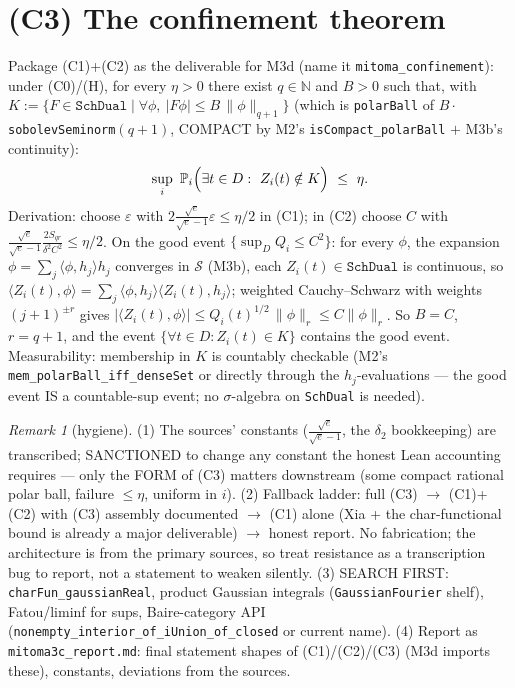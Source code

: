 \documentclass[11pt]{article}
\theoremstyle{plain}
\theoremstyle{remark}
\newtheorem{remark}{Remark}
\newcommand{\eps}{\varepsilon}\newcommand{\Sch}{\mathcal{S}}
\newcommand{\ip}[2]{\langle #1,#2\rangle}
\begin{document}
\section*{(C3) The confinement theorem}

Package (C1)+(C2) as the deliverable for M3d (name it
\texttt{mitoma\_confinement}): under (C0)/(H), for every $\eta>0$ there
exist $q\in\mathbb N$ and $B>0$ such that, with
$K:=\{F\in\texttt{SchDual}\mid\forall\phi,\ |F\phi|\le
B\,\|\phi\|_{q+1}\}$ (which is \texttt{polarBall} of
$B\cdot$\texttt{sobolevSeminorm}$(q{+}1)$, COMPACT by M2's
\texttt{isCompact\_polarBall} $+$ M3b's continuity):
\[
\sup_i\ \PP_i\Big(\exists t\in D:\ Z_i(t)\notin K\Big)\ \le\ \eta .
\]
Derivation: choose $\eps$ with $2\frac{\sqrt e}{\sqrt e-1}\eps\le\eta/2$
in (C1); in (C2) choose $C$ with
$\frac{\sqrt e}{\sqrt e-1}\frac{2S_{qr}}{\delta^2C^2}\le\eta/2$. On the
good event $\{\sup_DQ_i\le C^2\}$: for every $\phi$, the expansion
$\phi=\sum_j\ip{\phi}{h_j}h_j$ converges in $\Sch$ (M3b), each
$Z_i(t)\in\texttt{SchDual}$ is continuous, so
$\ip{Z_i(t)}{\phi}=\sum_j\ip{\phi}{h_j}\ip{Z_i(t)}{h_j}$; weighted
Cauchy--Schwarz with weights $(j+1)^{\pm r}$ gives
$|\ip{Z_i(t)}{\phi}|\le Q_i(t)^{1/2}\,\|\phi\|_r\le C\|\phi\|_r$. So
$B=C$, $r=q+1$, and the event $\{\forall t\in D:Z_i(t)\in K\}$ contains
the good event. Measurability: membership in $K$ is countably checkable
(M2's \texttt{mem\_polarBall\_iff\_denseSet} or directly through the
$h_j$-evaluations --- the good event IS a countable-sup event; no
$\sigma$-algebra on \texttt{SchDual} is needed).

\begin{remark}[hygiene]
(1) The sources' constants ($\frac{\sqrt e}{\sqrt e-1}$, the
$\delta_2$ bookkeeping) are transcribed; SANCTIONED to change any
constant the honest Lean accounting requires --- only the FORM of (C3)
matters downstream (some compact rational polar ball, failure $\le\eta$,
uniform in $i$).
(2) Fallback ladder: full (C3) $\to$ (C1)+(C2) with (C3) assembly
documented $\to$ (C1) alone (Xia + the char-functional bound is already
a major deliverable) $\to$ honest report. No fabrication; the
architecture is from the primary sources, so treat resistance as a
transcription bug to report, not a statement to weaken silently.
(3) SEARCH FIRST: \texttt{charFun\_gaussianReal}, product Gaussian
integrals (\texttt{GaussianFourier} shelf), Fatou/liminf for sups,
Baire-category API (\texttt{nonempty\_interior\_of\_iUnion\_of\_closed}
or current name).
(4) Report as \texttt{mitoma3c\_report.md}: final statement shapes of
(C1)/(C2)/(C3) (M3d imports these), constants, deviations from the
sources.
\end{remark}
\end{document}
